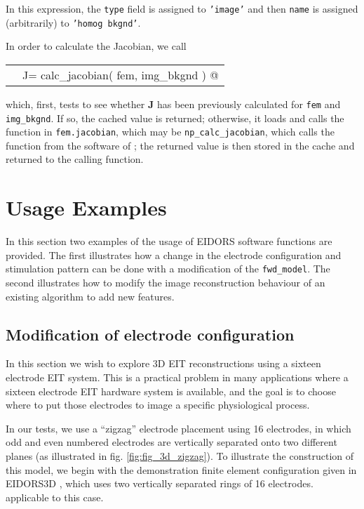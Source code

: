 \documentclass[12pt]{iopart}
\makeatletter
\newcommand{\CODEstart}{\medskip\begin{tabular}{ll}}
\newcommand{\CN}{\tt\scriptsize} %
\newcommand{\CC}{&\small\verb@}   % start code
\newcommand{\CODEend}{\end{tabular}\medskip}
\makeatother
\begin{document}
In this expression, the {\tt type} field is assigned
to {\tt 'image'} and then {\tt name} is assigned
(arbitrarily) to {\tt 'homog bkgnd'}.

In order to calculate the Jacobian, we call

\CODEstart
\CN    \CC J= calc_jacobian( fem, img_bkgnd ) @\\[-3pt]
\CODEend

which, first, tests to see whether {\bf J} has been previously
calculated for {\tt fem} and {\tt img\_bkgnd}. If
so, the cached value is returned; otherwise,
it loads and calls the function in {\tt fem.jacobian},
which may be {\tt np\_calc\_jacobian}, which 
calls the function from the software of
\cite{Polydorides_and_Lionheart_2002}; the returned
value is then stored in the cache and returned to the
calling function.

\section{ Usage Examples}

In this section two examples of the usage of EIDORS
software functions are provided. The first illustrates
how a change in the electrode configuration and stimulation 
pattern can be done
with a modification of the {\tt fwd\_model}.
The second illustrates how to modify the image reconstruction
behaviour of an existing algorithm to
add new features.

\subsection{Modification of electrode configuration}

In this section we wish to explore 3D EIT reconstructions
using a sixteen electrode EIT system. This is a practical
problem in many applications where a sixteen electrode
EIT hardware system is available, and the goal is to 
choose where to put those electrodes to image a specific
physiological process.

In our tests, we use a ``zigzag'' electrode placement 
using 16 electrodes, in which odd and even numbered
electrodes are vertically separated onto two different
planes (as illustrated in fig. \ref{fig:fig_3d_zigzag}).
To illustrate the construction of this model, we begin
with the demonstration finite element configuration
given in EIDORS3D \cite{Polydorides_and_Lionheart_2002},
which uses two vertically separated rings of 16 electrodes.
applicable to this case.
\end{document}
